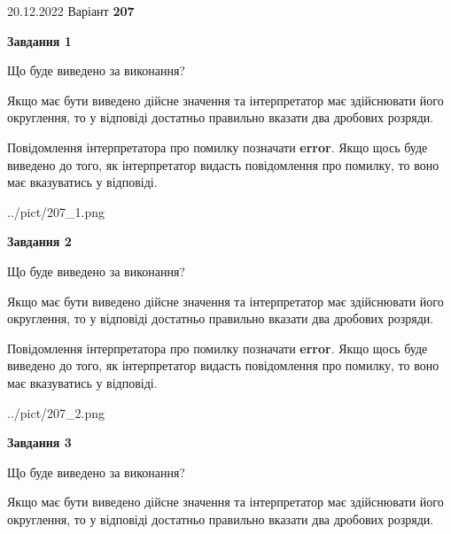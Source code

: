 \documentclass[12pt, ukrainian]{article}
\begin{document}
{20.12.2022 Варіант \No \textbf { 207 }\par}
{
\begin {Large}

{\begin {center}\textbf{Завдання 1}\end {center}}\par
Що буде виведено за виконання? \par

Якщо має бути виведено дійсне значення та інтерпретатор має здійснювати його округлення, 
то у відповіді достатньо правильно вказати два дробових розряди.

Повідомлення інтерпретатора про помилку позначати \textbf{error}.
Якщо щось буде виведено до того, як інтерпретатор видасть повідомлення про помилку, 
то воно має вказуватись у відповіді. \par

\begin{center}
	{../pict/207_1.png}
\end{center}
\newpage

{\begin {center}\textbf{Завдання 2}\end {center}}\par
Що буде виведено за виконання? \par

Якщо має бути виведено дійсне значення та інтерпретатор має здійснювати його округлення, 
то у відповіді достатньо правильно вказати два дробових розряди.

Повідомлення інтерпретатора про помилку позначати \textbf{error}.
Якщо щось буде виведено до того, як інтерпретатор видасть повідомлення про помилку, 
то воно має вказуватись у відповіді. \par

\begin{center}
	{../pict/207_2.png}
\end{center}
\newpage

{\begin {center}\textbf{Завдання 3}\end {center}}\par
Що буде виведено за виконання? \par

Якщо має бути виведено дійсне значення та інтерпретатор має здійснювати його округлення, 
то у відповіді достатньо правильно вказати два дробових розряди.


\end{Large}}
\end{document}
